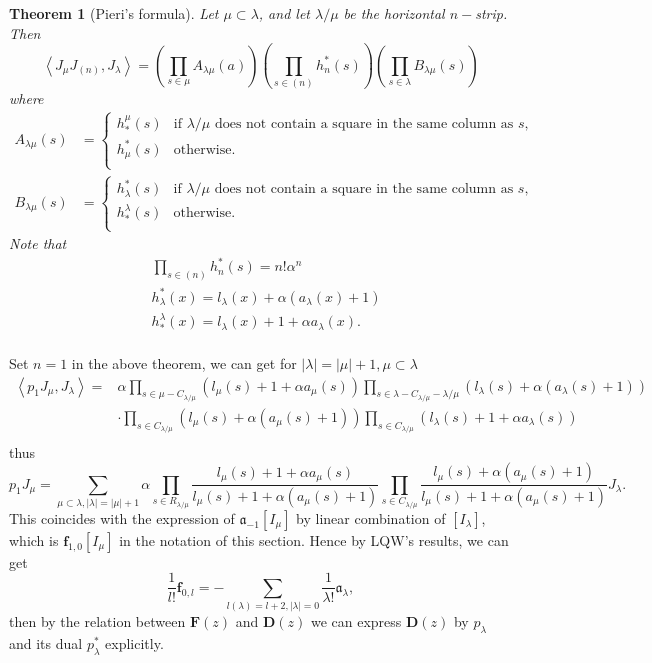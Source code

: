 \documentclass{article}
\newtheorem{theorem}{Theorem}[section]
\renewcommand{\frak}[1]{\mathfrak{#1}}
\newcommand{\lr}[1]{\left({#1}\right)}
\newcommand{\inprod}[1]{\left<{#1}\right>}
\begin{document}
\begin{theorem}[Pieri's formula]
Let $\mu\subset\lambda$, and let $\lambda/\mu$ be the horizontal $n-$strip. Then 
\[\inprod{J_\mu J_{(n)}, J_\lambda} = \lr{\prod_{s\in\mu}A_{\lambda\mu}(a)}\lr{\prod_{s\in(n)}h_n^*(s)}\lr{\prod_{s\in\lambda}B_{\lambda\mu}(s)}\]
where
\[
\begin{aligned}
A_{\lambda\mu}(s) &= 
\begin{cases}
h^{\mu}_*(s) & \text{if } \lambda/\mu \text{ does not contain a square in the same column as } s, \\
h^*_\mu(s) & \text{otherwise}.\\
\end{cases}\\
B_{\lambda\mu}(s) &= 
\begin{cases}
h^*_\lambda(s) & \text{if } \lambda/\mu \text{ does not contain a square in the same column as } s, \\
h^\lambda_*(s) & \text{otherwise}.\\
\end{cases}
\end{aligned}
\]
Note that 
\[
\begin{aligned}
&\prod_{s\in(n)}h_n^*(s) = n!\alpha^n\\
&h^*_\lambda(x) = l_\lambda(x) + \alpha(a_\lambda(x) + 1)\\
&h_*^\lambda(x) = l_\lambda(x) + 1 + \alpha a_\lambda(x). \\
\end{aligned}
\]
\end{theorem}
Set $n=1$ in the above theorem, we can get for $|\lambda| = |\mu| + 1, \mu\subset\lambda$
\[
\begin{aligned}
\inprod{p_1J_\mu, J_\lambda} = 
&\alpha\prod_{s\in\mu-C_{\lambda/\mu}}(l_\mu(s) + 1 + \alpha a_{\mu}(s))\prod_{s\in\lambda-C_{\lambda/\mu}-\lambda/\mu}(l_\lambda(s) + \alpha(a_{\lambda}(s) + 1))\\
&\cdot \prod_{s\in C_{\lambda/\mu}}(l_\mu(s) + \alpha (a_{\mu}(s) + 1)) \prod_{s\in C_{\lambda/\mu}}(l_\lambda(s) + 1 + \alpha a_{\lambda}(s)) \\
\end{aligned}
\]
thus
\[
p_1J_\mu = \sum_{\mu\subset\lambda, |\lambda| = |\mu| + 1}\alpha \prod_{s\in R_{\lambda/\mu}}\frac{l_\mu(s) + 1 + \alpha a_{\mu}(s)}{l_\mu(s) + 1 + \alpha (a_{\mu}(s) + 1)}
\prod_{s\in C_{\lambda/\mu}}\frac{l_\mu(s) + \alpha (a_{\mu}(s) + 1)}{l_\mu(s) + 1 + \alpha (a_{\mu}(s) + 1)}J_\lambda.
\]
This coincides with the expression of $\frak{a}_{-1}[I_\mu]$ by linear combination of $ [I_\lambda]$, which is $\mathbf{f}_{1,0} [I_\mu]$ in the notation of this section.
Hence by LQW's results, we can get 
\[\frac{1}{l!}\mathbf{f}_{0,l} = -\sum_{l(\lambda) = l+2, |\lambda| = 0} \frac{1}{\lambda!}\mathfrak{a}_\lambda,\]
then by the relation between $\mathbf{F}(z)$ and $\mathbf{D}(z)$ we can express $\mathbf{D}(z)$ by $p_\lambda$ and its dual $p_\lambda^*$ explicitly.
\end{document}
